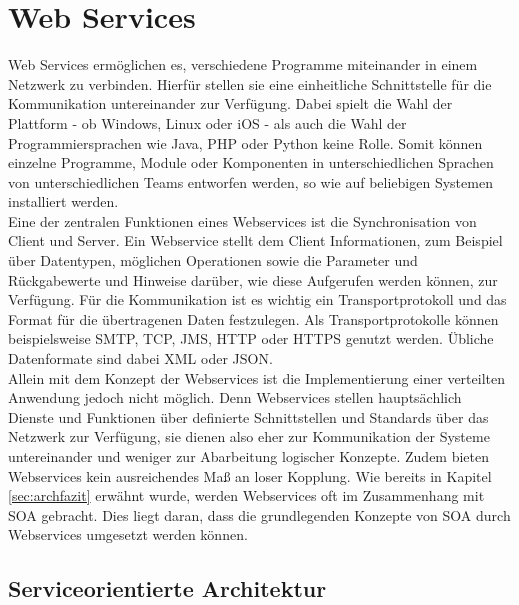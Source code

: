 \chapter{Web Services}
\label{sec:webservices}

Web Services ermöglichen es, verschiedene Programme miteinander in einem Netzwerk zu verbinden. Hierfür stellen sie eine einheitliche Schnittstelle für die Kommunikation untereinander zur Verfügung. Dabei spielt die Wahl der Plattform - ob Windows, Linux oder \ac{iOS} - als auch die Wahl der Programmiersprachen wie Java, \ac{PHP} oder Python keine Rolle. Somit können einzelne Programme, Module oder Komponenten in unterschiedlichen Sprachen von unterschiedlichen Teams entworfen werden, so wie auf beliebigen Systemen installiert werden. 
\\
\linebreak
Eine der zentralen Funktionen eines Webservices ist die Synchronisation von Client und Server. Ein Webservice stellt dem Client Informationen, zum Beispiel über Datentypen, möglichen Operationen sowie die Parameter und Rückgabewerte und Hinweise darüber, wie diese Aufgerufen werden können, zur Verfügung. Für die Kommunikation ist es wichtig ein Transportprotokoll und das Format für die übertragenen Daten festzulegen. Als Transportprotokolle können beispielsweise \ac{SMTP}, \ac{TCP}, \ac{JMS}, \ac{HTTP} oder \ac{HTTPS} genutzt werden. Übliche Datenformate sind dabei \ac{XML} oder \ac{JSON}. 
\\
\linebreak
Allein mit dem Konzept der Webservices ist die Implementierung einer verteilten Anwendung jedoch nicht möglich. Denn Webservices stellen hauptsächlich Dienste und Funktionen über definierte Schnittstellen und Standards über das Netzwerk zur Verfügung, sie dienen also eher zur Kommunikation der Systeme untereinander und weniger zur Abarbeitung logischer Konzepte. Zudem bieten Webservices kein ausreichendes Maß an loser Kopplung. Wie bereits in Kapitel \ref{sec:archfazit} erwähnt wurde, werden Webservices oft im Zusammenhang mit \ac{SOA} gebracht. Dies liegt daran, dass die grundlegenden Konzepte von \ac{SOA} durch Webservices umgesetzt werden können\autocites[Vgl.][23\psqq]{jws}[Vgl.][8\psqq]{soamws}.

\section{Serviceorientierte Architektur}
\label{sec:ws_soa}


